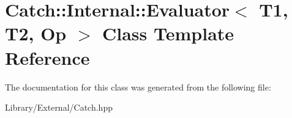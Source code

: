 \hypertarget{class_catch_1_1_internal_1_1_evaluator}{}\section{Catch\+:\+:Internal\+:\+:Evaluator$<$ T1, T2, Op $>$ Class Template Reference}
\label{class_catch_1_1_internal_1_1_evaluator}


The documentation for this class was generated from the following file\+:\begin{DoxyCompactItemize}
\item 
Library/\+External/Catch.\+hpp\end{DoxyCompactItemize}
